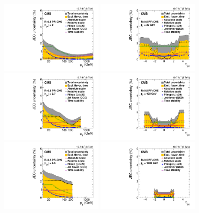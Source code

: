 \documentclass[11pt,twoside,a4paper,cmspaper,final,collab]{cms-tdr}
\begin{document}
\begin{figure}[htbp!]
\centering
\includegraphics[width=0.45\textwidth]{Figure_044-a.pdf}
\includegraphics[width=0.45\textwidth]{Figure_044-b.pdf}
\includegraphics[width=0.45\textwidth]{Figure_044-c.pdf}
\includegraphics[width=0.45\textwidth]{Figure_044-d.pdf}
\includegraphics[width=0.45\textwidth]{Figure_044-e.pdf}
\includegraphics[width=0.45\textwidth]{Figure_044-f.pdf}

\end{figure}
\end{document}
